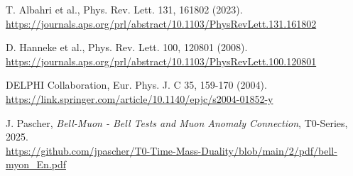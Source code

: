 \documentclass[12pt,a4paper]{article}
\begin{document}
\begin{thebibliography}{99}
		 T. Albahri et al., Phys. Rev. Lett. 131, 161802 (2023). \\
		\url{https://journals.aps.org/prl/abstract/10.1103/PhysRevLett.131.161802}
		
		 D. Hanneke et al., Phys. Rev. Lett. 100, 120801 (2008). \\
		\url{https://journals.aps.org/prl/abstract/10.1103/PhysRevLett.100.120801}
		
		 DELPHI Collaboration, Eur. Phys. J. C 35, 159-170 (2004). \\
		\url{https://link.springer.com/article/10.1140/epjc/s2004-01852-y}
		
		 J. Pascher, \textit{Bell-Muon - Bell Tests and Muon Anomaly Connection}, T0-Series, 2025. \\
		\url{https://github.com/jpascher/T0-Time-Mass-Duality/blob/main/2/pdf/bell-myon_En.pdf}
	\end{thebibliography}
\end{document}
